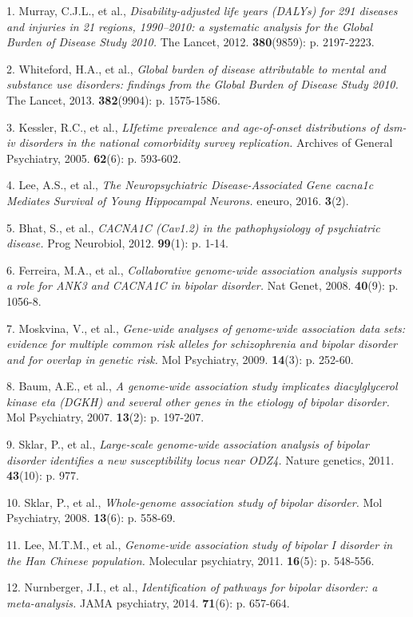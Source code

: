 \documentclass[]{article}
\begin{document}
1. Murray, C.J.L., et al., \emph{Disability-adjusted life years (DALYs)
for 291 diseases and injuries in 21 regions, 1990--2010: a systematic
analysis for the Global Burden of Disease Study 2010.} The Lancet, 2012.
\textbf{380}(9859): p. 2197-2223.

2. Whiteford, H.A., et al., \emph{Global burden of disease attributable
to mental and substance use disorders: findings from the Global Burden
of Disease Study 2010.} The Lancet, 2013. \textbf{382}(9904): p.
1575-1586.

3. Kessler, R.C., et al., \emph{LIfetime prevalence and age-of-onset
distributions of dsm-iv disorders in the national comorbidity survey
replication.} Archives of General Psychiatry, 2005. \textbf{62}(6): p.
593-602.

4. Lee, A.S., et al., \emph{The Neuropsychiatric Disease-Associated Gene
cacna1c Mediates Survival of Young Hippocampal Neurons.} eneuro, 2016.
\textbf{3}(2).

5. Bhat, S., et al., \emph{CACNA1C (Cav1.2) in the pathophysiology of
psychiatric disease.} Prog Neurobiol, 2012. \textbf{99}(1): p. 1-14.

6. Ferreira, M.A., et al., \emph{Collaborative genome-wide association
analysis supports a role for ANK3 and CACNA1C in bipolar disorder.} Nat
Genet, 2008. \textbf{40}(9): p. 1056-8.

7. Moskvina, V., et al., \emph{Gene-wide analyses of genome-wide
association data sets: evidence for multiple common risk alleles for
schizophrenia and bipolar disorder and for overlap in genetic risk.} Mol
Psychiatry, 2009. \textbf{14}(3): p. 252-60.

8. Baum, A.E., et al., \emph{A genome-wide association study implicates
diacylglycerol kinase eta (DGKH) and several other genes in the etiology
of bipolar disorder.} Mol Psychiatry, 2007. \textbf{13}(2): p. 197-207.

9. Sklar, P., et al., \emph{Large-scale genome-wide association analysis
of bipolar disorder identifies a new susceptibility locus near ODZ4.}
Nature genetics, 2011. \textbf{43}(10): p. 977.

10. Sklar, P., et al., \emph{Whole-genome association study of bipolar
disorder.} Mol Psychiatry, 2008. \textbf{13}(6): p. 558-69.

11. Lee, M.T.M., et al., \emph{Genome-wide association study of bipolar
I disorder in the Han Chinese population.} Molecular psychiatry, 2011.
\textbf{16}(5): p. 548-556.

12. Nurnberger, J.I., et al., \emph{Identification of pathways for
bipolar disorder: a meta-analysis.} JAMA psychiatry, 2014.
\textbf{71}(6): p. 657-664.
\end{document}
